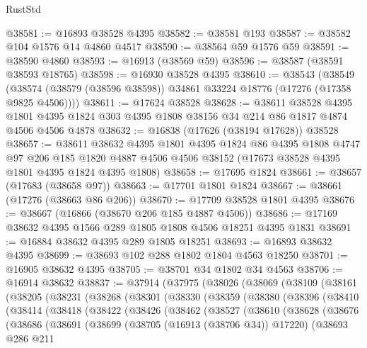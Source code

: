 \begin{lexlean}{RustStd}
\begin{coremodule}
@38581 := @16893 @38528 @4395
@38582 := @38581 @193
@38587 := @38582 @104 @1576 @14 @4860 @4517
@38590 := @38564 @59 @1576 @59
@38591 := @38590 @4860
@38593 := @16913 (@38569 @59)
@38596 := @38587 (@38591 @38593 @18765)
@38598 := @16930 @38528 @4395
@38610 := @38543
    (@38549 (@38574 (@38579 (@38596 @38598)) @34861 @33224 @18776 (@17276 (@17358 @9825 @4506))))
@38611 := @17624 @38528
@38628 := @38611
    @38528
    @4395
    @1801
    @4395
    @1824
    @303
    @4395
    @1808
    @38156
    @34
    @214
    @86
    @1817
    @4874
    @4506
    @4506
    @4878
@38632 := @16838 (@17626 (@38194 @17628)) @38528
@38657 := @38611
    @38632
    @4395
    @1801
    @4395
    @1824
    @86
    @4395
    @1808
    @4747
    @97
    @206
    @185
    @1820
    @4887
    @4506
    @4506
    @38152
    (@17673 @38528 @4395 @1801 @4395 @1824 @4395 @1808)
@38658 := @17695 @1824
@38661 := @38657 (@17683 (@38658 @97))
@38663 := @17701 @1801 @1824
@38667 := @38661 (@17276 (@38663 @86 @206))
@38670 := @17709 @38528 @1801 @4395
@38676 := @38667 (@16866 (@38670 @206 @185 @4887 @4506))
@38686 := @17169 @38632 @4395 @1566 @289 @1805 @1808 @4506 @18251 @4395 @1831
@38691 := @16884 @38632 @4395 @289 @1805 @18251
@38693 := @16893 @38632 @4395
@38699 := @38693 @102 @288 @1802 @1804 @4563 @18250
@38701 := @16905 @38632 @4395
@38705 := @38701 @34 @1802 @34 @4563
@38706 := @16914 @38632
@38837 := @37914
    (@37975
      (@38026
        (@38069
          (@38109
            (@38161
              (@38205
                (@38231
                  (@38268
                    (@38301
                      (@38330
                        (@38359
                          (@38380
                            (@38396
                              (@38410
                                (@38414
                                  (@38418
                                    (@38422
                                      (@38426
                                        (@38462
                                          (@38527
                                            (@38610
                                              (@38628
                                                (@38676
                                                  (@38686
                                                    (@38691
                                                      (@38699
                                                        (@38705 (@16913 (@38706 @34)) @17220)
                                                        (@38693
                                                          @286
                                                          @211

\end{coremodule}
\end{lexlean}
